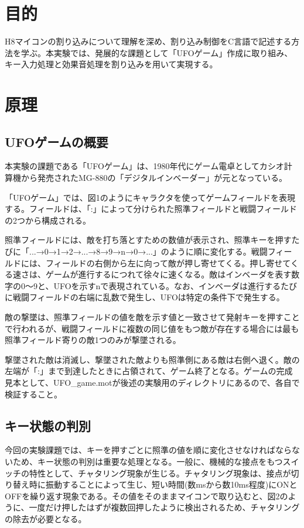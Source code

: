 ﻿\documentclass{jarticle}
\begin{document}
\section{目的}
H8マイコンの割り込みについて理解を深め、割り込み制御をC言語で記述する方法を学ぶ。本実験では、発展的な課題として「UFOゲーム」作成に取り組み、キー入力処理と効果音処理を割り込みを用いて実現する。

\section{原理}
\subsection{UFOゲームの概要}
本実験の課題である「UFOゲーム」は、1980年代にゲーム電卓としてカシオ計算機から発売されたMG-880の「デジタルインベーダー」が元となっている。


「UFOゲーム」では、図1のようにキャラクタを使ってゲームフィールドを表現する。フィールドは、「:」によって分けられた照準フィールドと戦闘フィールドの2つから構成される。


照準フィールドには、敵を打ち落とすための数値が表示され、照準キーを押すたびに「...→0→1→2→...→8→9→n→0→...」のように順に変化する。戦闘フィールドには、フィールドの右側から左に向って敵が押し寄せてくる。押し寄せてくる速さは、ゲームが進行するにつれて徐々に速くなる。敵はインベーダを表す数字の0〜9と、UFOを示すnで表現されている。なお、インベーダは進行するたびに戦闘フィールドの右端に乱数で発生し、UFOは特定の条件下で発生する。


敵の撃墜は、照準フィールドの値を敵を示す値と一致させて発射キーを押すことで行われるが、戦闘フィールドに複数の同じ値をもつ敵が存在する場合には最も照準フィールド寄りの敵1つのみが撃墜される。


撃墜された敵は消滅し、撃墜された敵よりも照準側にある敵は右側へ退く。敵の左端が「:」まで到達したときに占領されて、ゲーム終了となる。ゲームの完成見本として、UFO\_game.motが後述の実験用のディレクトリにあるので、各自で検証すること。

\subsection{キー状態の判別}
今回の実験課題では、キーを押すごとに照準の値を順に変化させなければならないため、キー状態の判別は重要な処理となる。一般に、機械的な接点をもつスイッチの特性として、チャタリング現象が生じる。チャタリング現象は、接点が切り替え時に振動することによって生じ、短い時間(数msから数10ms程度)にONとOFFを繰り返す現象である。その値をそのままマイコンで取り込むと、図2のように、一度だけ押したはずが複数回押したように検出されるため、チャタリングの除去が必要となる。
\end{document}
